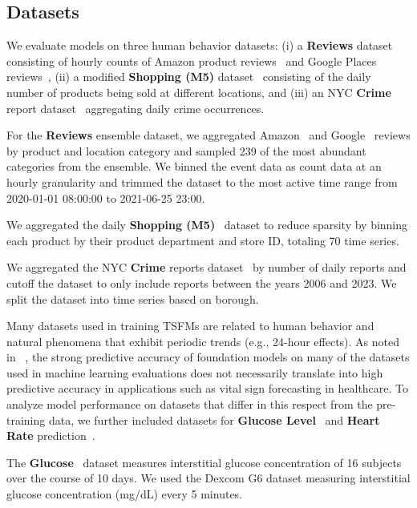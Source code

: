 \documentclass{article}
\begin{document}
\subsection{Datasets}\label{sec:appendix:datasets}
We evaluate models on three human behavior datasets: (i) a {\bf Reviews} dataset consisting of hourly counts of Amazon product reviews~\citep{amazonreview} and Google Places reviews~\citep{googlereview}, (ii) a modified \textbf{Shopping (M5)} dataset~\citep{m5dataset} consisting of the daily number of products being sold at different locations, and (iii) an NYC \textbf{Crime} report dataset~\citep{policedataset} aggregating daily crime occurrences. 


For the \textbf{Reviews} ensemble dataset, we aggregated Amazon~\cite{amazonreview} and Google~\cite{googlereview} reviews by product and location category and sampled 239 of the most abundant categories from the ensemble. 
We binned the event data as count data at an hourly granularity and trimmed the dataset to the most active time range from 2020-01-01 08:00:00 to 2021-06-25 23:00. 

We aggregated the daily \textbf{Shopping (M5)}~\cite{m5dataset} dataset to reduce sparsity by binning each product by their product department and store ID, totaling 70 time series.

We aggregated the NYC \textbf{Crime} reports dataset~\cite{policedataset} by number of daily reports and cutoff the dataset to only include reports between the years 2006 and 2023. We split the dataset into time series based on borough. 

Many datasets used in training TSFMs are related to human behavior and natural phenomena that exhibit periodic trends (e.g., 24-hour effects). 
As noted in ~\citet{pmlr-v259-gu25a}, the strong predictive accuracy of foundation models on many of the datasets used in machine learning evaluations does not necessarily translate into high predictive accuracy in applications such as vital sign forecasting in healthcare. 
To analyze model performance on datasets that differ in this respect from the pre-training data, we further included datasets for \textbf{Glucose Level}~\citep{glycemicvariability} and \textbf{Heart Rate} prediction~\citep{meditationdataset}. 

The \textbf{Glucose}~\cite{glycemicvariability} dataset measures interstitial glucose concentration of 16 subjects over the course of 10 days. We used the Dexcom G6 dataset measuring interstitial glucose concentration (mg/dL) every 5 minutes.
\end{document}

